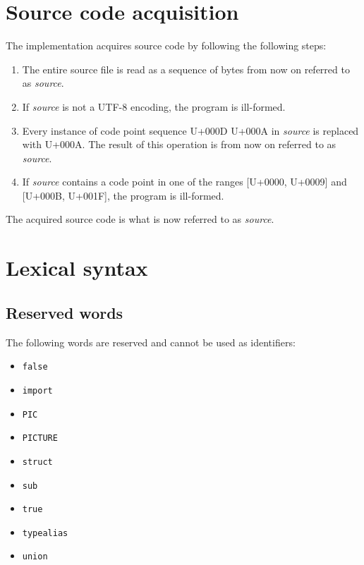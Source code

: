 \documentclass[12pt, oneside]{memoir}
\newcommand{\var}[1]{\emph{#1}}
\newcommand{\cp}[1]{U+#1}
\begin{document}
\chapter{Source code acquisition}

The implementation acquires source code by following the following steps:

\begin{enumerate}
  \item The entire source file is read as a sequence of bytes from now on
        referred to as \var{source}.
  \item If \var{source} is not a UTF-8 encoding, the program is ill-formed.
  \item Every instance of code point sequence \cp{000D} \cp{000A} in
        \var{source} is replaced with \cp{000A}. The result of this operation
        is from now on referred to as \var{source}.
  \item If \var{source} contains a code point in one of the ranges
        [\cp{0000}, \cp{0009}] and [\cp{000B}, \cp{001F}], the program is
        ill-formed.
\end{enumerate}

The acquired source code is what is now referred to as \var{source}.

\chapter{Lexical syntax}

\section{Reserved words}

The following words are reserved and cannot be used as identifiers:

\begin{itemize}
  \item \texttt{false}
  \item \texttt{import}
  \item \texttt{PIC}
  \item \texttt{PICTURE}
  \item \texttt{struct}
  \item \texttt{sub}
  \item \texttt{true}
  \item \texttt{typealias}
  \item \texttt{union}
\end{itemize}
\end{document}
